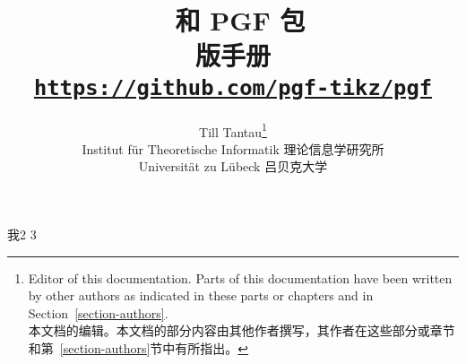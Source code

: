 %
%
%










\title{\tikzname\ 和 {\Large PGF} 包\\
  \large \pgfversion 版手册\\[1mm]
   
\large\href{https://github.com/pgf-tikz/pgf}{\texttt{https://github.com/pgf-tikz/pgf}}}
\author{Till Tantau\footnote{Editor of this documentation. Parts of
    this documentation have been written by other authors as indicated
    in these parts or chapters and in Section~\ref{section-authors}.\\本文档的编辑。本文档的部分内容由其他作者撰写，其作者在这些部分或章节和第~\ref{section-authors}节中有所指出。}\\
  \normalsize Institut für Theoretische Informatik 理论信息学研究所\\[-1mm]
  \normalsize Universität zu Lübeck 吕贝克大学}

\maketitle
\label{table-of-contents}

\tableofcontents 

\clearpage

我2 3




% 






